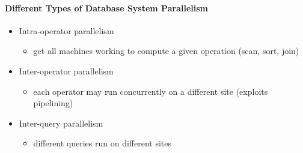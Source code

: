 \paragraph{Different Types of Database System Parallelism}
\begin{itemize}
\item Intra-operator parallelism
  \begin{itemize}
  \item get all machines working to compute a given operation
    (scan, sort, join)
  \end{itemize}

\item Inter-operator parallelism
  \begin{itemize}
  \item each operator may run concurrently on a different site
    (exploits pipelining)
  \end{itemize}

\item Inter-query parallelism
  \begin{itemize}
  \item different queries run on different sites
  \end{itemize}
\end{itemize}


